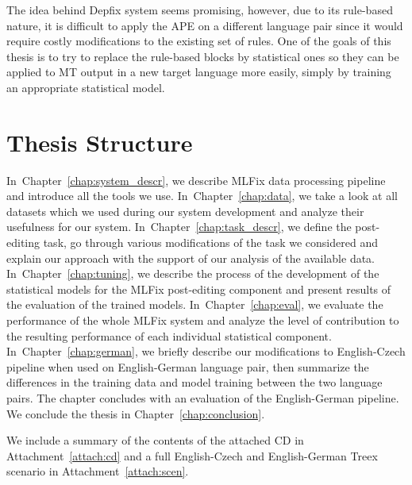 The idea behind Depfix system seems promising, however, due to its rule-based nature, it is difficult
to apply the APE on a different language pair since it would require costly modifications to the
existing set of rules. One of the goals of this thesis is to try to replace the rule-based blocks
by statistical ones so they can be applied to 
MT output in a new target language more easily, simply
by training an appropriate statistical model.


\section{Thesis Structure}

In~Chapter~\ref{chap:system_descr}, we describe MLFix data processing
pipeline and introduce all the tools we use.
In~Chapter~\ref{chap:data}, we take a look at all datasets which we used during our system
development and analyze their usefulness for our system.
In~Chapter~\ref{chap:task_descr}, we define the post-editing task, go through
various modifications of the task we considered and explain our
approach with the support of our analysis of the available data.
In~Chapter~\ref{chap:tuning}, we describe the process of the development
of the statistical models for the MLFix post-editing component and present
results of the evaluation of the trained models.
In~Chapter~\ref{chap:eval}, we evaluate the performance of the whole MLFix system
and analyze the level of contribution to the resulting performance
of each individual statistical component.
In~Chapter~\ref{chap:german}, we briefly describe our modifications to English-Czech pipeline
when used on English-German language pair, then summarize the differences
in the training data and model training between the two language pairs. The chapter concludes with an evaluation of the English-German pipeline.
We conclude the thesis in Chapter~\ref{chap:conclusion}.

We include a summary of the contents of the attached CD in Attachment~\ref{attach:cd} and a full English-Czech and English-German Treex scenario in Attachment~\ref{attach:scen}.

